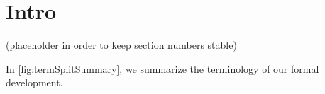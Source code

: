 \documentclass[pldi,preprint]{sigplanconf}
\begin{document}



\section{Intro}
(placeholder in order to keep section numbers stable)

In \ref{fig:termSplitSummary}, we summarize the terminology of our
formal development.
















\end{document}
